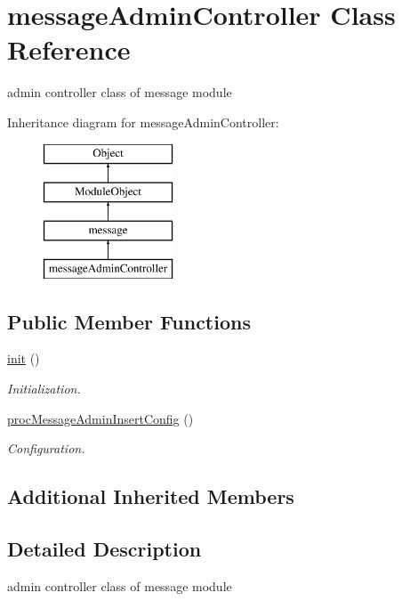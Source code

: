 \hypertarget{classmessageAdminController}{}\section{message\+Admin\+Controller Class Reference}
\label{classmessageAdminController}


admin controller class of message module  


Inheritance diagram for message\+Admin\+Controller\+:\begin{figure}[H]
\begin{center}
\leavevmode
\includegraphics[height=4.000000cm]{classmessageAdminController}
\end{center}
\end{figure}
\subsection*{Public Member Functions}
\begin{DoxyCompactItemize}
\item 
\hyperlink{classmessageAdminController_a926ccd4bc380531ba15d2df608416d1d}{init} ()
\begin{DoxyCompactList}\small\item\em Initialization. \end{DoxyCompactList}\item 
\hyperlink{classmessageAdminController_aedd1f833e2dd057dc55eb062b0d8ce0d}{proc\+Message\+Admin\+Insert\+Config} ()
\begin{DoxyCompactList}\small\item\em Configuration. \end{DoxyCompactList}\end{DoxyCompactItemize}
\subsection*{Additional Inherited Members}


\subsection{Detailed Description}
admin controller class of message module 

